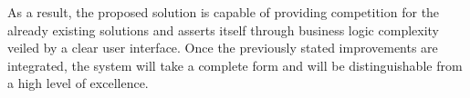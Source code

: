 As a result, the proposed solution is capable of providing competition for the already existing solutions and asserts itself through business logic complexity veiled by a clear user interface. Once the previously stated improvements are integrated, the system will take a complete form and will be distinguishable from a high level of excellence.